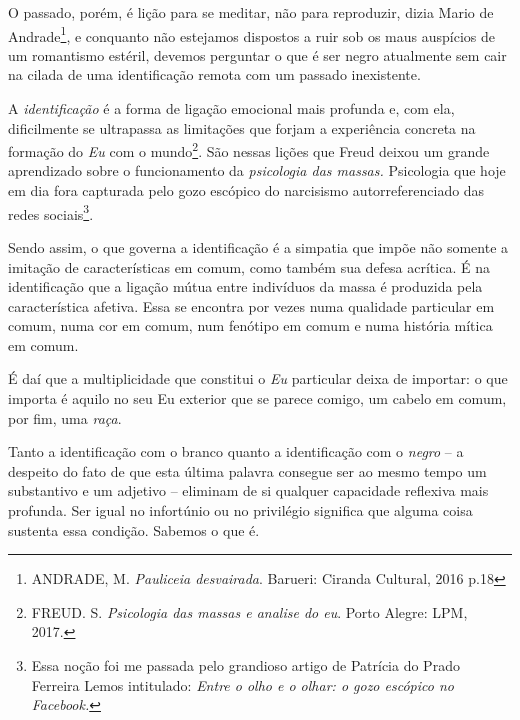 O passado, porém, é lição para se meditar, não para reproduzir, dizia
Mario de Andrade\footnote{ANDRADE, M. \emph{Pauliceia desvairada}.
  Barueri: Ciranda Cultural, 2016 p.18}, e conquanto não estejamos
dispostos a ruir sob os maus auspícios de um romantismo estéril, devemos
perguntar o que é ser negro atualmente sem cair na cilada de uma
identificação remota com um passado inexistente.

A \emph{identificação} é a forma de ligação emocional mais profunda e,
com ela, dificilmente se ultrapassa as limitações que forjam a
experiência concreta na formação do \emph{Eu} com o mundo\footnote{FREUD.
  S. \emph{Psicologia das massas e analise do eu}. Porto Alegre: LPM,
  2017.}. São nessas lições que Freud deixou um grande aprendizado sobre
o funcionamento da \emph{psicologia das massas.} Psicologia que hoje em
dia fora capturada pelo gozo escópico do narcisismo autorreferenciado
das redes sociais\footnote{Essa noção foi me passada pelo grandioso
  artigo de Patrícia do Prado Ferreira Lemos intitulado: \emph{Entre o
  olho e o olhar: o gozo escópico no Facebook.}}.

Sendo assim, o que governa a identificação é a simpatia que impõe não
somente a imitação de características em comum, como também sua defesa
acrítica. É na identificação que a ligação mútua entre indivíduos da
massa é produzida pela característica afetiva. Essa se encontra por
vezes numa qualidade particular em comum, numa cor em comum, num
fenótipo em comum e numa história mítica em comum.

É daí que a multiplicidade que constitui o \emph{Eu} particular deixa de
importar: o que importa é aquilo no seu Eu exterior que se parece
comigo, um cabelo em comum, por fim, uma \emph{raça}.

Tanto a identificação com o branco quanto a identificação com o
\emph{negro} -- a despeito do fato de que esta última palavra consegue
ser ao mesmo tempo um substantivo e um adjetivo -- eliminam de si
qualquer capacidade reflexiva mais profunda. Ser igual no infortúnio ou
no privilégio significa que alguma coisa sustenta essa condição. Sabemos
o que é.

